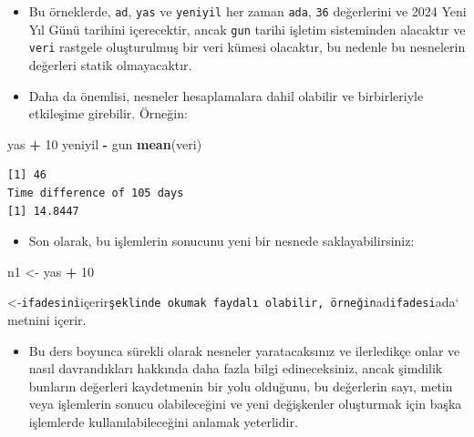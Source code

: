\documentclass[
  oneside]{book}
\newenvironment{Shaded}{\begin{snugshade}}{\end{snugshade}}
\newcommand{\DecValTok}[1]{\textcolor[rgb]{0.00,0.00,0.81}{#1}}
\newcommand{\FunctionTok}[1]{\textcolor[rgb]{0.13,0.29,0.53}{\textbf{#1}}}
\newcommand{\NormalTok}[1]{#1}
\newcommand{\OtherTok}[1]{\textcolor[rgb]{0.56,0.35,0.01}{#1}}
\newcommand{\SpecialCharTok}[1]{\textcolor[rgb]{0.81,0.36,0.00}{\textbf{#1}}}
\providecommand{\tightlist}{%
  \setlength{\itemsep}{0pt}\setlength{\parskip}{0pt}}
\begin{document}
\begin{itemize}
\item
  Bu örneklerde, \texttt{ad}, \texttt{yas} ve \texttt{yeniyil} her zaman \texttt{ada}, \texttt{36} değerlerini ve 2024 Yeni Yıl Günü tarihini içerecektir, ancak \texttt{gun} tarihi işletim sisteminden alacaktır ve \texttt{veri} rastgele oluşturulmuş bir veri kümesi olacaktır, bu nedenle bu nesnelerin değerleri statik olmayacaktır.
\item
  Daha da önemlisi, nesneler hesaplamalara dahil olabilir ve birbirleriyle etkileşime girebilir. Örneğin:
\end{itemize}

\begin{Shaded}
\begin{Highlighting}[]
\NormalTok{yas }\SpecialCharTok{+} \DecValTok{10}
\NormalTok{yeniyil }\SpecialCharTok{{-}}\NormalTok{ gun}
\FunctionTok{mean}\NormalTok{(veri)}
\end{Highlighting}
\end{Shaded}

\begin{verbatim}
[1] 46
Time difference of 105 days
[1] 14.8447
\end{verbatim}

\begin{itemize}
\tightlist
\item
  Son olarak, bu işlemlerin sonucunu yeni bir nesnede saklayabilirsiniz:
\end{itemize}

\begin{Shaded}
\begin{Highlighting}[]
\NormalTok{n1 }\OtherTok{\textless{}{-}}\NormalTok{ yas }\SpecialCharTok{+} \DecValTok{10}
\end{Highlighting}
\end{Shaded}

\begin{try}
\textless-\texttt{ifadesini}içerir\texttt{şeklinde\ okumak\ faydalı\ olabilir,\ örneğin}ad\texttt{ifadesi}ada`
metnini içerir.
\end{try}

\begin{itemize}
\tightlist
\item
  Bu ders boyunca sürekli olarak nesneler yaratacaksınız ve ilerledikçe onlar ve nasıl davrandıkları hakkında daha fazla bilgi edineceksiniz, ancak şimdilik bunların değerleri kaydetmenin bir yolu olduğunu, bu değerlerin sayı, metin veya işlemlerin sonucu olabileceğini ve yeni değişkenler oluşturmak için başka işlemlerde kullanılabileceğini anlamak yeterlidir.
\end{itemize}
\end{document}
